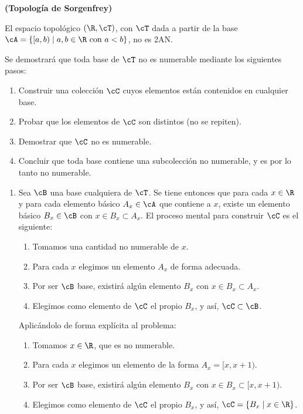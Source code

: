 \begin{ej}
    {\bf (Topología de Sorgenfrey)} 
    \item El espacio topológico $(\R, \cT)$, con $\cT$ dada a partir de la base $\cA = \{[a,b) \mid a,b \in \R \text{ con } a < b\}$, no es 2AN.\smallskip

    Se demostrará que toda base de $\cT$ no es numerable mediante los siguientes pasos:

    \begin{enumerate}[topsep=0pt,itemsep=0pt]
        \item Construir una colección $\cC$ cuyos elementos están contenidos en cualquier base.
        \item Probar que los elementos de $\cC$ son distintos (no se repiten).
        \item Demostrar que $\cC$ no es numerable.
        \item Concluir que toda base contiene una subcolección no numerable, y es por lo tanto no numerable.
    \end{enumerate}

    \begin{enumerate}[topsep=5pt,itemsep=0pt]
        \item Sea $\cB$ una base cualquiera de $\cT$. Se tiene entonces que para cada $x\in \R$ y para cada elemento básico $A_x \in \cA$ que contiene a $x$, existe un elemento básico $B_x \in \cB$ con $x \in B_x \subset A_x$. El proceso mental para construir $\cC$ es el siguiente:
        \begin{enumerate}[topsep=2pt]
            \item Tomamos una cantidad no numerable de $x$.
            \item Para cada $x$ elegimos un elemento $A_x$ de forma adecuada.
            \item Por ser $\cB$ base, existirá algún elemento $B_x$ con $x \in B_x \subset A_x$.
            \item Elegimos como elemento de $\cC$ el propio $B_x$, y así, $\cC \subset \cB$.
        \end{enumerate}
        Aplicándolo de forma explícita al problema:
        \begin{enumerate}[topsep=2pt]
            \item Tomamos $x\in \R$, que es no numerable.
            \item Para cada $x$ elegimos un elemento de la forma $A_x = [x,x + 1)$.
            \item Por ser $\cB$ base, existirá algún elemento $B_x$ con $x \in B_x \subset [x,x + 1)$.
            \item Elegimos como elemento de $\cC$ el propio $B_x$, y así, $\cC = \{B_x \mid  x\in \R\}$.
        \end{enumerate}


\end{enumerate}
\end{ej}
